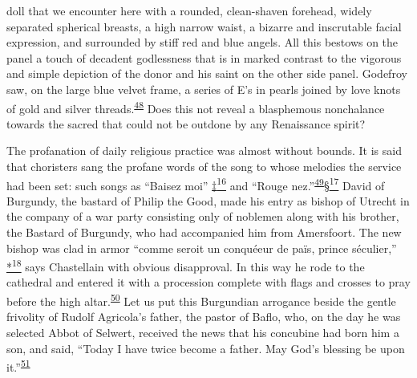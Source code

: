 doll that we encounter here with a rounded, clean-shaven forehead,
widely separated spherical breasts, a high narrow waist, a bizarre and
inscrutable facial expression, and surrounded by stiff red and blue
angels. All this bestows on the panel a touch of decadent godlessness
that is in marked contrast to the vigorous and simple depiction of the
donor and his saint on the other side panel. Godefroy saw, on the large
blue velvet frame, a series of E's in pearls joined by love knots of
gold and silver
threads.\textsuperscript{\protect\hypertarget{13_Chapter_Six__THE_DEPICTION_OF_TH.xhtmlux5cux23id_1175}{\protect\hyperlink{23_NOTES.xhtmlux5cux23id_1176}{48}}}
Does this not reveal a blasphemous nonchalance towards the sacred that
could not be outdone by any Renaissance spirit?

The profanation of daily religious practice was almost without bounds.
It is said that choristers sang the profane words of the song to whose
melodies the service had been set: such songs as ``Baisez moi''
\protect\hypertarget{13_Chapter_Six__THE_DEPICTION_OF_TH.xhtmlux5cux23id_3019}{\protect\hyperlink{23_NOTES.xhtmlux5cux23id_3020}{‡\textsuperscript{16}}}
and ``Rouge
nez.''\textsuperscript{\protect\hypertarget{13_Chapter_Six__THE_DEPICTION_OF_TH.xhtmlux5cux23id_1173}{\protect\hyperlink{23_NOTES.xhtmlux5cux23id_1174}{49}}}\protect\hypertarget{13_Chapter_Six__THE_DEPICTION_OF_TH.xhtmlux5cux23id_3021}{\protect\hyperlink{23_NOTES.xhtmlux5cux23id_3022}{§\textsuperscript{17}}}
David of Burgundy, the bastard of Philip the Good, made his entry as
bishop of Utrecht in the
com\protect\hypertarget{13_Chapter_Six__THE_DEPICTION_OF_TH.xhtmlux5cux23page_183}{}{}pany
of a war party consisting only of noblemen along with his brother, the
Bastard of Burgundy, who had accompanied him from Amersfoort. The new
bishop was clad in armor ``comme seroit un conquéeur de païs, prince
séculier,''
\protect\hypertarget{13_Chapter_Six__THE_DEPICTION_OF_TH.xhtmlux5cux23id_3023}{\protect\hyperlink{23_NOTES.xhtmlux5cux23id_3024}{*\textsuperscript{18}}}
says Chastellain with obvious disapproval. In this way he rode to the
cathedral and entered it with a procession complete with flags and
crosses to pray before the high
altar.\textsuperscript{\protect\hypertarget{13_Chapter_Six__THE_DEPICTION_OF_TH.xhtmlux5cux23id_1171}{\protect\hyperlink{23_NOTES.xhtmlux5cux23id_1172}{50}}}
Let us put this Burgundian arrogance beside the gentle frivolity of
Rudolf Agricola's father, the pastor of Baflo, who, on the day he was
selected Abbot of Selwert, received the news that his concubine had born
him a son, and said, ``Today I have twice become a father. May God's
blessing be upon
it.''\textsuperscript{\protect\hypertarget{13_Chapter_Six__THE_DEPICTION_OF_TH.xhtmlux5cux23id_1169}{\protect\hyperlink{23_NOTES.xhtmlux5cux23id_1170}{51}}}

